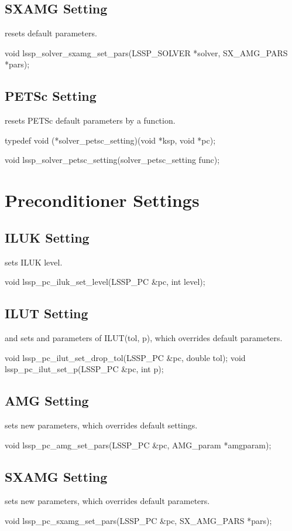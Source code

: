 \subsection{SXAMG Setting}
 resets default parameters.
\begin{evb}
void lssp_solver_sxamg_set_pars(LSSP_SOLVER *solver, SX_AMG_PARS *pars);
\end{evb}

\subsection{PETSc Setting}
 resets PETSc default parameters by a function.
\begin{evb}
typedef void (*solver_petsc_setting)(void *ksp, void *pc);

void lssp_solver_petsc_setting(solver_petsc_setting func);
\end{evb}

\section{Preconditioner Settings}

\subsection{ILUK Setting}

 sets ILUK level.
\begin{evb}
void lssp_pc_iluk_set_level(LSSP_PC &pc, int level);
\end{evb}

\subsection{ILUT Setting}
 and  sets  and 
parameters of ILUT(tol, p), which overrides default parameters.
\begin{evb}
void lssp_pc_ilut_set_drop_tol(LSSP_PC &pc, double tol);
void lssp_pc_ilut_set_p(LSSP_PC &pc, int p);
\end{evb}

\subsection{AMG Setting}
 sets new parameters, which overrides default settings.
\begin{evb}
void lssp_pc_amg_set_pars(LSSP_PC &pc, AMG_param *amgparam);
\end{evb}

\subsection{SXAMG Setting}
 sets new parameters, which overrides default parameters.
\begin{evb}
void lssp_pc_sxamg_set_pars(LSSP_PC &pc, SX_AMG_PARS *pars);
\end{evb}
